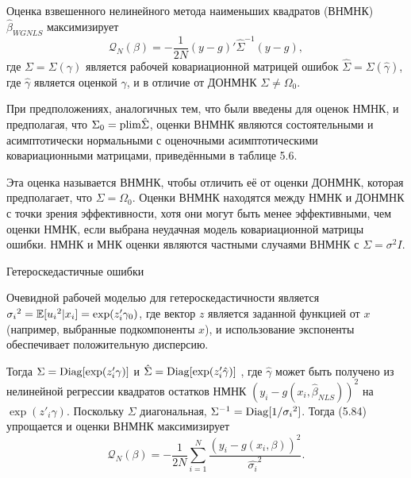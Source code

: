 Оценка взвешенного нелинейного метода наименьших квадратов (ВНМНК) $\hat{\beta}_{WGNLS}$ максимизирует
\begin{equation}
\mathcal{Q}_{N}(\beta)=-\frac{1}{2N}(y-g)' \hat{\Sigma}^{-1} (y-g),
\end{equation}
где $\Sigma = \Sigma (\gamma)$  является рабочей ковариационной матрицей ошибок $\hat{\Sigma}=\Sigma(\hat{\gamma})$, где $\hat{\gamma}$ является оценкой $\gamma$, и в отличие от ДОНМНК $\Sigma \not = \Omega_0$.

При предположениях, аналогичных тем, что были введены для оценок НМНК, и предполагая, что $\Sigma_0=\mathrm{plim } \hat{\Sigma}$, оценки ВНМНК являются состоятельными и асимптотически нормальными с оценочными асимптотическими ковариационными матрицами, приведёнными в таблице 5.6.

Эта оценка называется ВНМНК, чтобы отличить её от оценки ДОНМНК, которая предполагает, что $\Sigma=\Omega_0$. Оценки ВНМНК находятся между НМНК и ДОНМНК с точки зрения эффективности, хотя они могут быть менее эффективными, чем оценки НМНК, если  выбрана неудачная модель ковариационной матрицы ошибки. НМНК и МНК оценки являются частными случаями  ВНМНК с $\Sigma=\sigma^{2}I$.

\begin{center}
Гетероскедастичные ошибки
\end{center}

Очевидной рабочей моделью для гетероскедастичности является ${\sigma_i}^{2}=\mathbb{E}[{u_i}^2|x_i]=\exp(z'_i\gamma_0)$, где вектор $z$ является заданной функцией от $x$ (например, выбранные подкомпоненты $x$), и использование экспоненты обеспечивает положительную дисперсию.

Тогда $\Sigma=\mathrm{Diag}[\exp(z'_i\gamma)]$ и $\hat{\Sigma}=\mathrm{Diag}[\exp(z'_i\hat{\gamma})]$ , где $\hat{\gamma}$ может быть получено из нелинейной регрессии квадратов остатков НМНК $(y_i-g(x_i,\hat{\beta}_{NLS}))^2$ на $\exp(z'_i\gamma)$. Поскольку $\Sigma$ диагональная, $\Sigma^{-1}=\mathrm{Diag}[1/{\sigma_i}^{2}]$. Тогда (5.84) упрощается и оценки ВНМНК максимизирует
\begin{equation}
\mathcal{Q}_{N}(\beta)=-\frac{1}{2N} \sum_{i=1}^{N} \frac{(y_i-g(x_i,\beta))^2}{\hat{\sigma_i}^{2}}.
\end{equation}

